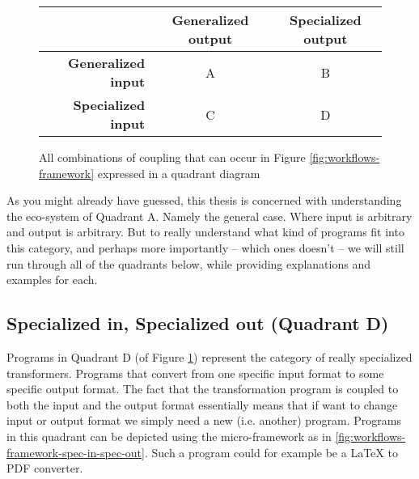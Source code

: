 \documentclass{scrreprt}
\begin{document}
\begin{figure}[h]
  \centering

  \begin{tabular}{r | c | c}
    & \textbf{Generalized output} & \textbf{Specialized output} \\ \hline

    \textbf{Generalized input} &
    A
    &
    B 

    \\ \hline

    \textbf{Specialized input} &
    C
    &
    D
  \end{tabular}

  \caption{All combinations of coupling that can occur in Figure \ref{fig:workflows-framework} expressed in a quadrant diagram}
  \label{fig:microframework-quadrant}
\end{figure}


As you might already have guessed, this thesis is concerned with understanding the eco-system of Quadrant A. Namely the general case. Where input is arbitrary and output is arbitrary. But to really understand what kind of programs fit into this category, and perhaps more importantly -- which ones doesn't -- we will still run through all of the quadrants below, while providing explanations and examples for each.

















\subsection{Specialized in, Specialized out (Quadrant D)}
Programs in Quadrant D (of Figure \ref{fig:microframework-quadrant}) represent the category of really specialized transformers. Programs that convert from one specific input format to some specific output format. The fact that the transformation program is coupled to both the input and the output format essentially means that if want to change input or output format we simply need a new (i.e. another) program.  Programs in this quadrant can be depicted using the micro-framework as in \ref{fig:workflows-framework-spec-in-spec-out}. Such a program could for example be a \LaTeX{} to PDF converter. 
\end{document}
